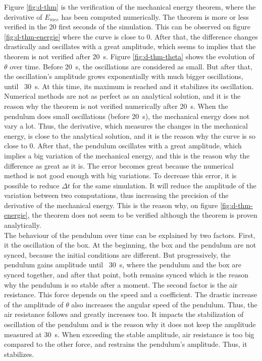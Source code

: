 \documentclass[a4paper,12pt,twoside]{article}
\begin{document}
Figure \ref{fig:d-thm} is the verification of the mechanical energy theorem, where the derivative of $E_{mec}$ has been computed numerically.
The theorem is more or less verified in the \num{20} first seconds of the simulation.
This can be observed on figure \ref{fig:d-thm-energie} where the curve is close to 0.
After that, the difference changes drastically and oscillates with a great amplitude, which seems to implies that the theorem is not verified after \SI{20}{\s}.
Figure \ref{fig:d-thm-theta} shows the evolution of $\theta$ over time.
Before \SI{20}{\s}, the oscillations are considered as small. 
But after that, the oscillation's amplitude grows exponentially with much bigger oscillations, until ~\SI{30}{\s}.
At this time, its maximum is reached and it stabilizes its oscillation.\\

Numerical methods are not as perfect as an analytical solution, and it is the reason why the theorem is not verified numerically after \SI{20}{\s}.
When the pendulum does small oscillations (before \SI{20}{\s}), the mechanical energy does not vary a lot.
Thus, the derivative, which measures the changes in the mechanical energy, is close to the analytical solution, and it is the reason why the curve is so close to 0.
After that, the pendulum oscillates with a great amplitude, which implies a big variation of the mechanical energy, and this is the reason why the difference as great as it is.
The error becomes great because the numerical method is not good enough with big variations.
To decrease this error, it is possible to reduce $\Delta t$ for the same simulation.
It will reduce the amplitude of the variation between two computations, thus increasing the precision of the derivative of the mechanical energy.
This is the reason why, on figure \ref{fig:d-thm-energie}, the theorem does not seem to be verified although the theorem is proven analytically.\\

The behaviour of the pendulum over time can be explained by two factors.
First, it the oscillation of the box.
At the beginning, the box and the pendulum are not synced, because the initial conditions are different.
But progressively, the pendulum gains amplitude until ~\SI{30}{\s}, where the pendulum and the box are synced together, and after that point, both remains synced which is the reason why the pendulum is so stable after a moment.
The second factor is the air resistance.
This force depends on the speed and a coefficient.
The drastic increase of the amplitude of $\theta$ also increases the angular speed of the pendulum.
Thus, the air resistance follows and greatly increases too.
It impacts the stabilization of oscillation of the pendulum and is the reason why it does not keep the amplitude measured at \SI{30}{\s}.
When exceeding the stable amplitude, air resistance is too big compared to the other force, and restrains the pendulum's amplitude.
Thus, it stabilizes.\\
\end{document}
